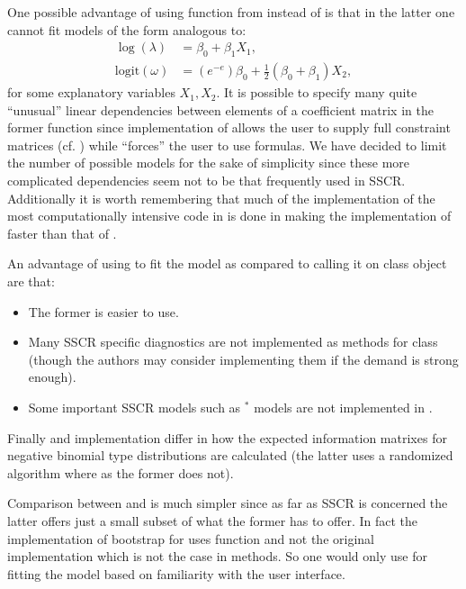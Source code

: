 \documentclass[nojss]{jss}
\newcommand{\1}{\mathcal{I}} \newcommand{\bZero}{\boldsymbol{0}}
\begin{document}
One possible advantage of using  function from 
instead of  is that in the latter one cannot fit
models of the form analogous to: \begin{align*}
  \log(\lambda)         &= \beta_{0} + \beta_{1}X_{1},\\
  \text{logit}(\omega)  &= (e^{-e})\beta_{0} + \frac{1}{2}(\beta_{0}+\beta_{1})X_{2},
\end{align*} for some explanatory variables \(X_{1}, X_{2}\). It is
possible to specify many quite ``unusual'' linear dependencies between
elements of a coefficient matrix in the former function since
implementation of  allows the user to supply full constraint
matrices (cf. \citet{yee2015vgam}) while  ``forces''
the user to use formulas. We have decided to limit the number of
possible models for the sake of simplicity since these more complicated
dependencies seem not to be that frequently used in SSCR. Additionally
it is worth remembering that much of the implementation of the most
computationally intensive code in  is done in 
making the implementation of  faster than that of
.

An advantage of using  to fit the model as
compared to calling it on  class object are that:

\begin{itemize}
  \item The former is easier to use.
  \item Many SSCR specific diagnostics are not implemented as methods for  class (though the authors may consider implementing them if the demand is strong enough).
  \item Some important SSCR models such as $^{\ast}$ models are not implemented in .
\end{itemize}

Finally  and  implementation differ in how
the expected information matrixes for negative binomial type
distributions are calculated (the latter uses a randomized algorithm
where as the former does not).

Comparison between  and  is much
simpler since as far as SSCR is concerned the latter offers just a small
subset of what the former has to offer. In fact the implementation of
bootstrap for  uses  function
and not the original implementation which is not the case in
 methods. So one would only use  for
fitting the model based on familiarity with the user interface.
\end{document}
